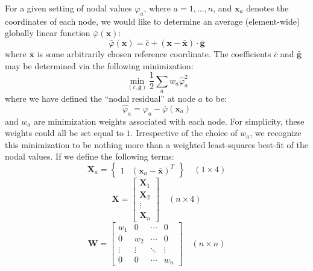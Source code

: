 \documentclass[11pt]{article} %
\begin{document}
For a given setting of nodal values $\varphi_a$, where $a = 1, \ldots, n$, and $\mathbf{x}_a$ denotes the coordinates of each node, we would like to determine an average (element-wide) globally linear function $\bar{\varphi} (\mathbf{x})$:
\begin{equation}
	\bar{\varphi} (\mathbf{x}) = \bar{c} + (\mathbf{x} - \bar{\mathbf{x}}) \cdot \bar{\mathbf{g}}
\end{equation}
where $\bar{\mathbf{x}}$ is some arbitrarily chosen reference coordinate. The coefficients $\bar{c}$ and $\bar{\mathbf{g}}$ may be determined via the following minimization:
\begin{equation}
	\min_{(\bar{c}, \bar{\mathbf{g}})} \frac{1}{2} \sum_a w_a \hat{\varphi}_a^2
\end{equation}
where we have defined the ``nodal residual'' at node $a$ to be:
\begin{equation}
	\hat{\varphi}_a = \varphi_a - \bar{\varphi} (\mathbf{x}_a)
\end{equation}
and $w_a$ are minimization weights associated with each node. For simplicity, these weights could all be set equal to $1$. Irrespective of the choice of $w_a$, we recognize this minimization to be nothing more than a weighted least-squares best-fit of the nodal values. If we define the following terms:
\begin{equation}
	\mathbf{X}_a = \left\{ \begin{array}{cc} 1 & (\mathbf{x}_a - \bar{\mathbf{x}})^T \end{array} \right\} \quad (1\times4)
\end{equation}
\begin{equation}
	\mathbf{X} = \left[ \begin{array}{c} \mathbf{X}_1 \\ \mathbf{X}_2 \\ \vdots \\ \mathbf{X}_n \end{array} \right] \quad (n\times4)
\end{equation}
\begin{equation}
	\mathbf{W} = \left[ \begin{array}{cccc} w_1 & 0 & \cdots & 0 \\ 0 & w_2 & \cdots & 0 \\ \vdots & \vdots & \ddots & \vdots \\ 0 & 0 & \cdots & w_n \end{array} \right] \quad (n\times n)
\end{equation}
\end{document}
